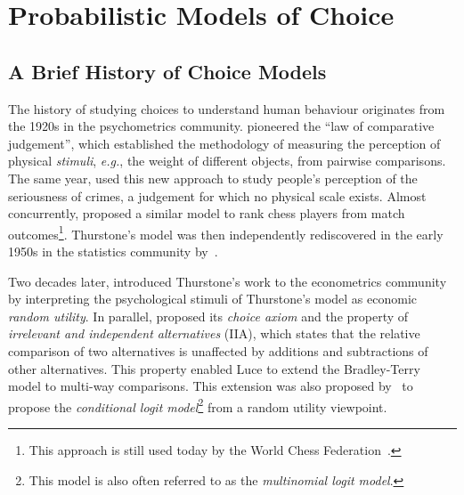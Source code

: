 \section{Probabilistic Models of Choice}
\label{in:sec:models}

\subsection{A Brief History of Choice Models}

The history of studying choices to understand human behaviour originates from the 1920s in the psychometrics community.
\citet{thurstone1927law} pioneered the ``law of comparative judgement'', which established the methodology of measuring the perception of physical \emph{stimuli}, \textit{e.g.}, the weight of different objects, from pairwise comparisons.
The same year, \citet{thurstone1927method} used this new approach to study people's perception of the seriousness of crimes, a judgement for which no physical scale exists.
Almost concurrently, \citet{zermelo1928berechnung} proposed a similar model to rank chess players from match outcomes\footnote{This approach is still used today by the World Chess Federation~\citep{elo1978rating}.}.
Thurstone's model was then independently rediscovered in the early 1950s in the statistics community by~\citet{bradley1952rank}.

Two decades later, \citet{marschak1959binary} introduced Thurstone's work to the econometrics community by interpreting the psychological stimuli of Thurstone's model as economic \emph{random utility}.
In parallel, \citet{luce1959individual} proposed its \emph{choice axiom} and the property of \emph{irrelevant and independent alternatives} (IIA), which states that the relative comparison of two alternatives is unaffected by additions and subtractions of other alternatives.
This property enabled Luce to extend the Bradley-Terry model to multi-way comparisons.
This extension was also proposed by~\citet{mcfadden1973conditional} to propose the \emph{conditional logit model}\footnote{This model is also often referred to as the \emph{multinomial logit model}.} from a random utility viewpoint.

